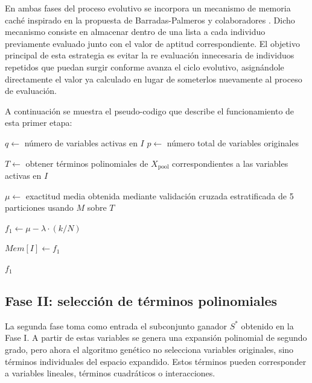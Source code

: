 En ambas fases del proceso evolutivo se incorpora un mecanismo de memoria caché inspirado en la propuesta de Barradas-Palmeros y colaboradores \cite{barradas2024computational}. Dicho mecanismo consiste en almacenar dentro de una lista a cada individuo previamente evaluado junto con el valor de aptitud correspondiente. El objetivo principal de esta estrategia es evitar la re evaluación innecesaria de individuos repetidos que puedan surgir conforme avanza el ciclo evolutivo, asignándole directamente el valor ya calculado en lugar de someterlos nuevamente al proceso de evaluación.

A continuación se muestra el pseudo-codigo que describe el funcionamiento de esta primer etapa:

\begin{algorithm}[H]
		 		 
		
	
	$q \gets$ número de variables activas en $I$\;
	$p \gets$ número total de variables originales\;
	
	
	
	$T \gets$ obtener términos polinomiales de $X_{\text{pool}}$ correspondientes a las variables activas en $I$\;
	
	$\mu \gets$ exactitud media obtenida mediante validación cruzada estratificada de 5 particiones usando $M$ sobre $T$\;
	
	$f_1 \gets \mu - \lambda \cdot (k/N)$\;
	
	$Mem[I] \gets f_1$\;
	
	\Return $f_1$\;
	
	\caption{Evaluación de aptitud con expansión polinomial}
\end{algorithm}


\subsection{Fase II: selección de términos polinomiales}

La segunda fase toma como entrada el subconjunto ganador $S^*$ obtenido en la Fase I. A partir de estas variables se genera una expansión polinomial de segundo grado, pero ahora el  algoritmo genético no selecciona variables originales, sino términos individuales del espacio expandido. Estos términos pueden corresponder a variables lineales, términos cuadráticos o interacciones.

